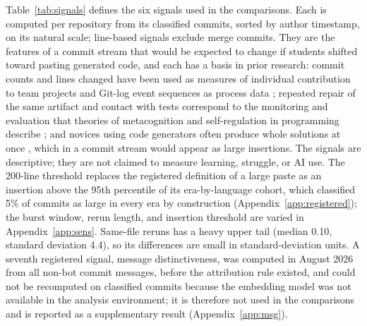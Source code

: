 \documentclass[acmsmall,screen,review,anonymous]{acmart}
\begin{document}
Table~\ref{tab:signals} defines the six signals used in the comparisons. Each is computed per repository from its classified commits, sorted by author timestamp, on its natural scale; line-based signals exclude merge commits. They are the features of a commit stream that would be expected to change if students shifted toward pasting generated code, and each has a basis in prior research: commit counts and lines changed have been used as measures of individual contribution to team projects \citep{hundhausen2023github} and Git-log event sequences as process data \citep{macak2021process}; repeated repair of the same artifact and contact with tests correspond to the monitoring and evaluation that theories of metacognition and self-regulation in programming describe \citep{loksa2022metacognition}; and novices using code generators often produce whole solutions at once \citep{kazemitabaar2023novices, prather2024widening}, which in a commit stream would appear as large insertions. The signals are descriptive; they are not claimed to measure learning, struggle, or AI use. The 200-line threshold replaces the registered definition of a large paste as an insertion above the 95th percentile of its era-by-language cohort, which classified 5\% of commits as large in every era by construction (Appendix~\ref{app:registered}); the burst window, rerun length, and insertion threshold are varied in Appendix~\ref{app:sens}. Same-file reruns has a heavy upper tail (median 0.10, standard deviation 4.4), so its differences are small in standard-deviation units. A seventh registered signal, message distinctiveness, was computed in August 2026 from all non-bot commit messages, before the attribution rule existed, and could not be recomputed on classified commits because the embedding model was not available in the analysis environment; it is therefore not used in the comparisons and is reported as a supplementary result (Appendix~\ref{app:msg}).
\end{document}
